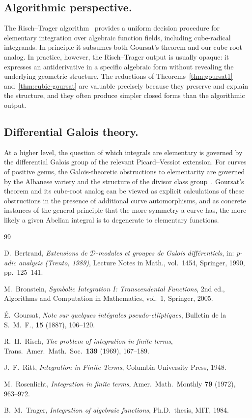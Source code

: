 \documentclass[11pt,a4paper]{article}
\theoremstyle{plain}
\theoremstyle{definition}
\theoremstyle{remark}
\begin{document}
\subsection*{Algorithmic perspective.}
The Risch--Trager algorithm~\cite{Risch1969,Trager1984,Bronstein2005} provides a uniform decision procedure for elementary integration over algebraic function fields, including cube-radical integrands. In principle it subsumes both Goursat's theorem and our cube-root analog. In practice, however, the Risch--Trager output is usually opaque: it expresses an antiderivative in a specific algebraic form without revealing the underlying geometric structure. The reductions of Theorems~\ref{thm:goursat1} and~\ref{thm:cubic-goursat} are valuable precisely because they preserve and explain the structure, and they often produce simpler closed forms than the algorithmic output.

\subsection*{Differential Galois theory.}
At a higher level, the question of which integrals are elementary is governed by the differential Galois group of the relevant Picard--Vessiot extension. For curves of positive genus, the Galois-theoretic obstructions to elementarity are governed by the Albanese variety and the structure of the divisor class group~\cite{Bertrand1990}. Goursat's theorem and its cube-root analog can be viewed as explicit calculations of these obstructions in the presence of additional curve automorphisms, and as concrete instances of the general principle that the more symmetry a curve has, the more likely a given Abelian integral is to degenerate to elementary functions.



\begin{thebibliography}{99}

D.~Bertrand,
\emph{Extensions de $\mathcal{D}$-modules et groupes de Galois diff\'erentiels},
in: \emph{p-adic analysis (Trento, 1989)}, Lecture Notes in Math., vol.~1454, Springer, 1990, pp.~125--141.

M.~Bronstein,
\emph{Symbolic Integration I: Transcendental Functions},
2nd ed., Algorithms and Computation in Mathematics, vol.~1, Springer, 2005.

\'E.~Goursat,
\emph{Note sur quelques int\'egrales pseudo-elliptiques},
Bulletin de la S.~M.~F., \textbf{15} (1887), 106--120.

R.~H.~Risch,
\emph{The problem of integration in finite terms},
Trans.\ Amer.\ Math.\ Soc.\ \textbf{139} (1969), 167--189.

J.~F.~Ritt,
\emph{Integration in Finite Terms},
Columbia University Press, 1948.

M.~Rosenlicht,
\emph{Integration in finite terms},
Amer.\ Math.\ Monthly \textbf{79} (1972), 963--972.

B.~M.~Trager,
\emph{Integration of algebraic functions},
Ph.D.\ thesis, MIT, 1984.

\end{thebibliography}
\end{document}
